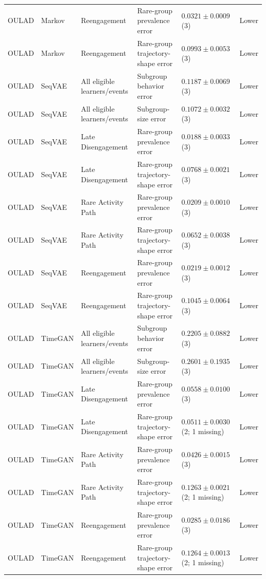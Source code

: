 \begin{longtable}{@{}p{2.25cm}p{2.05cm}p{4.7cm}p{5.0cm}p{2.6cm}p{1.25cm}@{}}
OULAD & Markov & Reengagement & Rare-group prevalence error & $0.0321 \mathbin{\pm} 0.0009$ (3) & Lower \\
OULAD & Markov & Reengagement & Rare-group trajectory-shape error & $0.0993 \mathbin{\pm} 0.0053$ (3) & Lower \\
OULAD & SeqVAE & All eligible learners/events & Subgroup behavior error & $0.1187 \mathbin{\pm} 0.0069$ (3) & Lower \\
OULAD & SeqVAE & All eligible learners/events & Subgroup-size error & $0.1072 \mathbin{\pm} 0.0032$ (3) & Lower \\
OULAD & SeqVAE & Late Disengagement & Rare-group prevalence error & $0.0188 \mathbin{\pm} 0.0033$ (3) & Lower \\
OULAD & SeqVAE & Late Disengagement & Rare-group trajectory-shape error & $0.0768 \mathbin{\pm} 0.0021$ (3) & Lower \\
OULAD & SeqVAE & Rare Activity Path & Rare-group prevalence error & $0.0209 \mathbin{\pm} 0.0010$ (3) & Lower \\
OULAD & SeqVAE & Rare Activity Path & Rare-group trajectory-shape error & $0.0652 \mathbin{\pm} 0.0038$ (3) & Lower \\
OULAD & SeqVAE & Reengagement & Rare-group prevalence error & $0.0219 \mathbin{\pm} 0.0012$ (3) & Lower \\
OULAD & SeqVAE & Reengagement & Rare-group trajectory-shape error & $0.1045 \mathbin{\pm} 0.0064$ (3) & Lower \\
OULAD & TimeGAN & All eligible learners/events & Subgroup behavior error & $0.2205 \mathbin{\pm} 0.0882$ (3) & Lower \\
OULAD & TimeGAN & All eligible learners/events & Subgroup-size error & $0.2601 \mathbin{\pm} 0.1935$ (3) & Lower \\
OULAD & TimeGAN & Late Disengagement & Rare-group prevalence error & $0.0558 \mathbin{\pm} 0.0100$ (3) & Lower \\
OULAD & TimeGAN & Late Disengagement & Rare-group trajectory-shape error & $0.0511 \mathbin{\pm} 0.0030$ (2; 1 missing) & Lower \\
OULAD & TimeGAN & Rare Activity Path & Rare-group prevalence error & $0.0426 \mathbin{\pm} 0.0015$ (3) & Lower \\
OULAD & TimeGAN & Rare Activity Path & Rare-group trajectory-shape error & $0.1263 \mathbin{\pm} 0.0021$ (2; 1 missing) & Lower \\
OULAD & TimeGAN & Reengagement & Rare-group prevalence error & $0.0285 \mathbin{\pm} 0.0186$ (3) & Lower \\
OULAD & TimeGAN & Reengagement & Rare-group trajectory-shape error & $0.1264 \mathbin{\pm} 0.0013$ (2; 1 missing) & Lower \\
\end{longtable}
